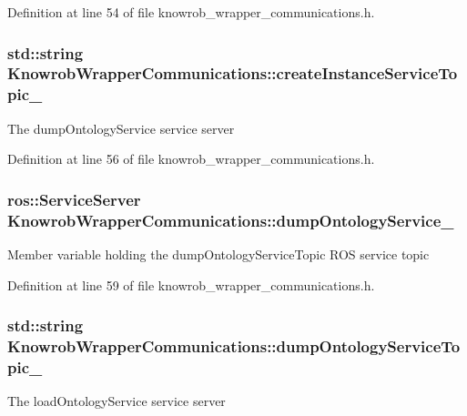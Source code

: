 Definition at line 54 of file knowrob\-\_\-wrapper\-\_\-communications.\-h.

\hypertarget{classKnowrobWrapperCommunications_ae4d64655c9da3ad80b79197f7cc761ef}{
\subsubsection[{create\-Instance\-Service\-Topic\-\_\-}]{\setlength{\rightskip}{0pt plus 5cm}std\-::string Knowrob\-Wrapper\-Communications\-::create\-Instance\-Service\-Topic\-\_\-\hspace{0.3cm}{\ttfamily [private]}}}\label{classKnowrobWrapperCommunications_ae4d64655c9da3ad80b79197f7cc761ef}
The dump\-Ontology\-Service service server 

Definition at line 56 of file knowrob\-\_\-wrapper\-\_\-communications.\-h.

\hypertarget{classKnowrobWrapperCommunications_af0ad3b846b7441ed1256ab14501689dc}{
\subsubsection[{dump\-Ontology\-Service\-\_\-}]{\setlength{\rightskip}{0pt plus 5cm}ros\-::\-Service\-Server Knowrob\-Wrapper\-Communications\-::dump\-Ontology\-Service\-\_\-\hspace{0.3cm}{\ttfamily [private]}}}\label{classKnowrobWrapperCommunications_af0ad3b846b7441ed1256ab14501689dc}
Member variable holding the dump\-Ontology\-Service\-Topic R\-O\-S service topic 

Definition at line 59 of file knowrob\-\_\-wrapper\-\_\-communications.\-h.

\hypertarget{classKnowrobWrapperCommunications_a581d7bbfc90299d80e504c59df83510d}{
\subsubsection[{dump\-Ontology\-Service\-Topic\-\_\-}]{\setlength{\rightskip}{0pt plus 5cm}std\-::string Knowrob\-Wrapper\-Communications\-::dump\-Ontology\-Service\-Topic\-\_\-\hspace{0.3cm}{\ttfamily [private]}}}\label{classKnowrobWrapperCommunications_a581d7bbfc90299d80e504c59df83510d}
The load\-Ontology\-Service service server 

